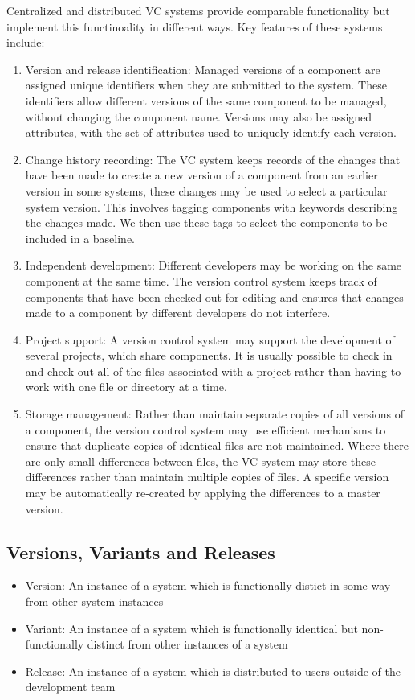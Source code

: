 Centralized and distributed VC systems provide comparable functionality but implement this functinoality in different ways. Key features of these systems include:
\begin{enumerate}
    \item Version and release identification: Managed versions of a component are assigned unique identifiers when they are submitted to the system. These identifiers allow different versions of the same component to be managed, without changing the component name. Versions may also be assigned attributes, with the set of attributes used to uniquely identify each version.
    \item Change history recording: The VC system keeps records of the changes that have been made to create a new version of a component from an earlier version in some systems, these changes may be used to select a particular system version. This involves tagging components with keywords describing the changes made. We then use these tags to select the components to be included in a baseline.
    \item Independent development: Different developers may be working on the same component at the same time. The version control system keeps track of components that have been checked out for editing and ensures that changes made to a component by different developers do not interfere.
    \item Project support: A version control system may support the development of several projects, which share components. It is usually possible to check in and check out all of the files associated with a project rather than having to work with one file or directory at a time.
    \item Storage management: Rather than maintain separate copies of all versions of a component, the version control system may use efficient mechanisms to ensure that duplicate copies of identical files are not maintained. Where there are only small differences between files, the VC system may store these differences rather than maintain multiple copies of files. A specific version may be automatically re-created by applying the differences to a master version.
\end{enumerate}

\subsection{Versions, Variants and Releases}
\begin{itemize}
    \item Version: An instance of a system which is functionally distict in some way from other system instances
    \item Variant: An instance of a system which is functionally identical but non-functionally distinct from other instances of a system
    \item Release: An instance of a system which is distributed to users outside of the development team
\end{itemize}

